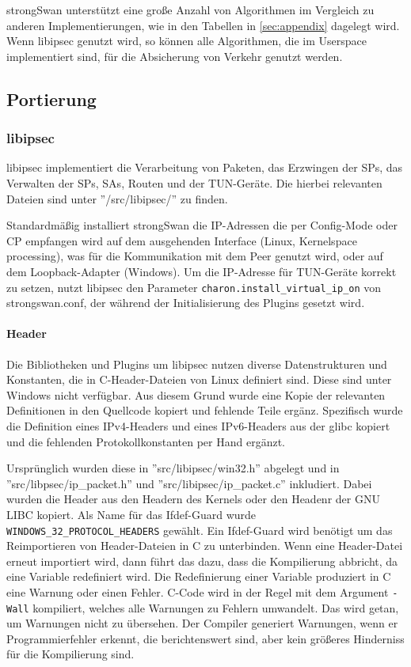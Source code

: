 strongSwan unterstützt eine große Anzahl von Algorithmen im Vergleich zu anderen Implementierungen,
wie in den Tabellen in \autoref{sec:appendix} dagelegt wird. Wenn libipsec genutzt wird,
so können alle Algorithmen, die im Userspace implementiert sind, für die Absicherung
von Verkehr genutzt werden.

\subsection{Portierung}
\subsubsection{libipsec}
libipsec implementiert die Verarbeitung von Paketen, das Erzwingen der \acp{SP},
das Verwalten der \acp{SP}, \acp{SA}, Routen und der TUN-Geräte.
Die hierbei relevanten Dateien sind unter ''/src/libipsec/'' zu finden.

Standardmäßig installiert strongSwan die IP-Adressen die per Config-Mode
oder \ac{CP} empfangen wird auf dem ausgehenden Interface (Linux, Kernelspace processing),
was für die Kommunikation mit dem Peer genutzt wird,
oder auf dem Loopback-Adapter (Windows).
Um die IP-Adresse für TUN-Geräte korrekt zu setzen, nutzt libipsec den Parameter
\texttt{charon.install\_virtual\_ip\_on} von strongswan.conf, der während der Initialisierung
des Plugins gesetzt wird.
\paragraph{Header}
Die Bibliotheken und Plugins um libipsec nutzen diverse Datenstrukturen und Konstanten,
die in C-Header-Dateien von Linux definiert sind. Diese sind unter Windows nicht verfügbar.
Aus diesem Grund wurde eine Kopie der relevanten Definitionen in den Quellcode kopiert
und fehlende Teile ergänz.
Spezifisch wurde die Definition eines \ac{IP}v4-Headers
und eines \ac{IP}v6-Headers aus der glibc kopiert und die fehlenden Protokollkonstanten per Hand ergänzt.

Ursprünglich wurden diese in ''src/libipsec/win32.h'' abgelegt und in ''src/libpsec/ip\_packet.h'' und ''src/libipsec/ip\_packet.c''
inkludiert. Dabei wurden die Header aus den Headern des Kernels oder den Headenr der GNU LIBC kopiert.
Als Name für das Ifdef-Guard wurde \\
\texttt{WINDOWS\_32\_PROTOCOL\_HEADERS} gewählt. Ein Ifdef-Guard wird benötigt um das Reimportieren
von Header-Dateien in C zu unterbinden. Wenn eine Header-Datei erneut importiert wird,
dann führt das dazu, dass die Kompilierung abbricht, da eine Variable redefiniert wird.
Die Redefinierung einer Variable produziert in C eine Warnung oder einen Fehler.
C-Code wird in der Regel mit dem Argument \texttt{-Wall} kompiliert, welches
alle Warnungen zu Fehlern umwandelt. Das wird getan, um Warnungen nicht zu übersehen.
Der Compiler generiert Warnungen, wenn er Programmierfehler erkennt,
die berichtenswert sind, aber kein größeres Hinderniss für die Kompilierung sind.

